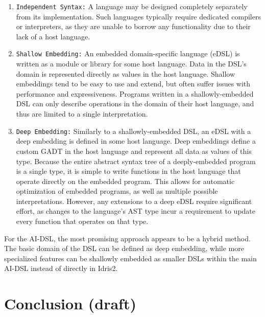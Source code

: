 \documentclass[]{report}
\begin{document}
\begin{enumerate}
  \item \texttt{Independent Syntax:} A language may be designed completely
        separately from its implementation.  Such languages typically require
        dedicated compilers or interpreters, as they are unable to borrow any
        functionality due to their lack of a host language.

  \item \texttt{Shallow Embedding:} An embedded domain-specific language (eDSL)
        is written as a module or library for some host language.  Data in the
        DSL's domain is represented directly as values in the host language.
        Shallow embeddings tend to be easy to use and extend, but often suffer
        issues with performance and expressiveness.  Programs written in a
        shallowly-embedded DSL can only describe operations in the domain of
        their host language, and thus are limited to a single interpretation.

  \item \texttt{Deep Embedding:} Similarly to a shallowly-embedded DSL,
        an eDSL with a deep embedding is defined in some host language.
        Deep embeddings define a custom GADT in the host language and represent
        all data as values of this type.  Because the entire abstract syntax
        tree of a deeply-embedded program is a single type, it is simple to
        write functions in the host language that operate directly on the
        embedded program. This allows for automatic optimization of embedded
        programs, as well as multiple possible interpretations.  However, any
        extensions to a deep eDSL require significant effort, as changes to the
        language's AST type incur a requirement to update every function that
        operates on that type.

\end{enumerate}

For the AI-DSL, the most promising approach appears to be a hybrid method.
The basic domain of the DSL can be defined as deep embedding, while more
specialized features can be shallowly embedded as smaller DSLs within the main
AI-DSL instead of directly in Idris2.



\chapter{Conclusion (draft)}
\end{document}

